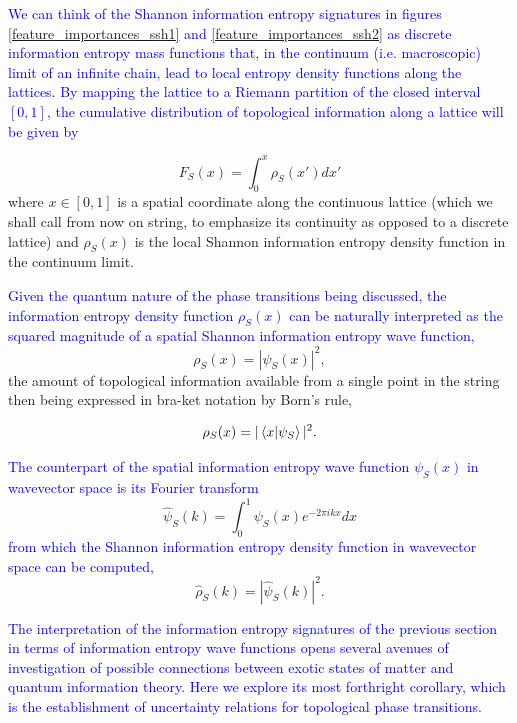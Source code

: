 \documentclass[10pt]{revtex4-1}
\begin{document}
\textcolor{blue}{
We can think of the Shannon information entropy signatures in figures \ref{feature_importances_ssh1} and \ref{feature_importances_ssh2} as discrete information entropy mass functions that, in the continuum (i.e. macroscopic) limit of an infinite chain, lead to local entropy density functions along the lattices. By mapping the lattice to a Riemann partition of the closed interval $[0,1]$, the cumulative distribution of topological information along a lattice will be given by} 

\begin{equation}
\label{entropy_density}
F_S(x) = \int_{0}^x\rho_S(x')dx'
\end{equation}
where $x \in [0,1]$ is a spatial coordinate along the continuous lattice (which we shall call from now on string, to emphasize its continuity as opposed to a discrete lattice) and $\rho_S(x)$ is the local Shannon information entropy density function in the continuum limit. 

\textcolor{blue}{
Given the quantum nature of the phase transitions being discussed, the information entropy density function $\rho_S(x)$ can be naturally interpreted as the squared magnitude of a spatial Shannon information entropy wave function,
}
\begin{equation}
\label{shannon_wave_function}
\rho_S(x) = |\psi_S(x)|^2,
\end{equation}
the amount of topological information available from a single point in the string then being expressed in bra-ket notation by Born's rule,  

\begin{equation}
\label{born_rule_spatial}
\rho_S(x) = |\braket{x|\psi_S}|^2.
\end{equation}

\textcolor{blue}{
The counterpart of the spatial information entropy wave function $\psi_S(x)$ in wavevector space is its Fourier transform }
\begin{equation}
\label{fourier_shannon_wave_function}
\hat{\psi}_S(k) = \int_{0}^{1}\psi_S(x)e^{-2\pi ikx}dx
\end{equation}
\textcolor{blue}{
from which the Shannon information entropy density function in wavevector space can be computed,}
\begin{equation}
\label{shannon_wave_function_wavevector_space}
\hat{\rho}_S(k) = |\hat{\psi}_S(k)|^2.
\end{equation}

\textcolor{blue}{
The interpretation of the information entropy signatures of the previous section in terms of information entropy wave functions opens several avenues of investigation of possible connections between exotic states of matter and quantum information theory.  Here we explore its most forthright corollary, which is the establishment of uncertainty relations for topological phase transitions. 
}
\end{document}
